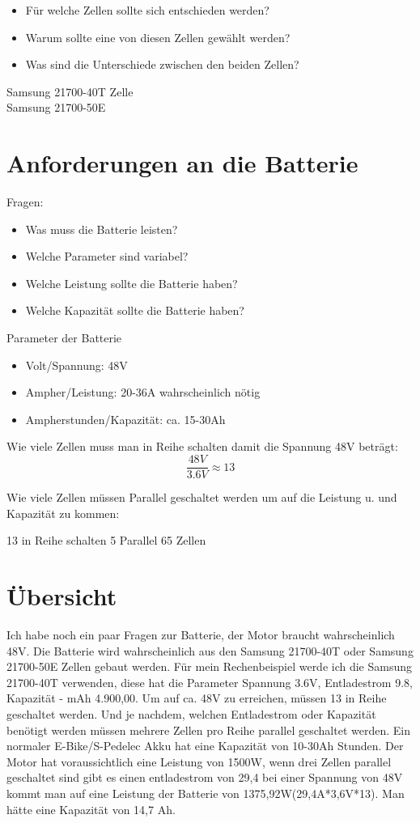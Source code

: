 \begin{itemize}
    \item Für welche Zellen sollte sich entschieden werden?
    \item Warum sollte eine von diesen Zellen gewählt werden?
    \item Was sind die Unterschiede zwischen den beiden Zellen?
\end{itemize}
Samsung 21700-40T Zelle \\
Samsung 21700-50E


\section{Anforderungen an die Batterie}
Fragen:
\begin{itemize}
    \item Was muss die Batterie leisten?
    \item Welche Parameter sind variabel?
    \item Welche Leistung sollte die Batterie haben?
    \item Welche Kapazität sollte die Batterie haben?
\end{itemize}

Parameter der Batterie
\begin{itemize}
    \item Volt/Spannung: 48V
    \item Ampher/Leistung: 20-36A wahrscheinlich nötig
    \item Ampherstunden/Kapazität: ca. 15-30Ah
\end{itemize}

Wie viele Zellen muss man in Reihe schalten damit die Spannung 48V beträgt:
\[ \frac{48V}{3.6V}\approx 13\]

Wie viele Zellen müssen Parallel geschaltet werden um auf die Leistung u. und Kapazität zu kommen:


13 in Reihe schalten
5 Parallel
65 Zellen

\section{Übersicht}
Ich habe noch ein paar Fragen zur Batterie, der Motor braucht wahrscheinlich 48V. Die Batterie wird wahrscheinlich aus den Samsung 21700-40T oder
Samsung 21700-50E Zellen gebaut werden. Für mein Rechenbeispiel werde ich die Samsung 21700-40T verwenden, diese hat die Parameter Spannung 3.6V, Entladestrom 9.8, Kapazität - mAh 4.900,00. Um auf ca. 48V zu erreichen, müssen 13 in Reihe geschaltet werden. Und je nachdem, welchen Entladestrom oder Kapazität benötigt werden müssen mehrere Zellen pro Reihe parallel geschaltet werden. Ein normaler E-Bike/S-Pedelec Akku hat eine Kapazität von 10-30Ah Stunden. Der Motor hat voraussichtlich eine Leistung von 1500W, wenn drei Zellen parallel geschaltet sind gibt es einen entladestrom von 29,4 bei einer Spannung von 48V kommt man auf eine Leistung der Batterie von 1375,92W(29,4A*3,6V*13). Man hätte eine Kapazität von 14,7 Ah. \\
 
